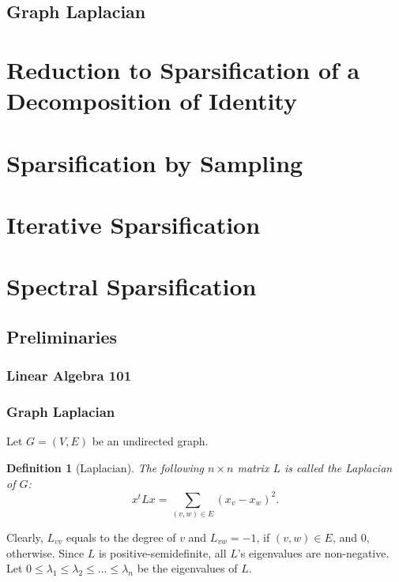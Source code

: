 \documentclass[12pt]{article}
\newtheorem{definition}{Definition}
\begin{document}
    \subsection{Graph Laplacian}

    \section{Reduction to Sparsification of a Decomposition of Identity}
    \label{reduction_unity}

    \section{Sparsification by Sampling}
    \label{resistances}

    \section{Iterative Sparsification}
    \label{iterative}

    \section{Spectral Sparsification}

    \subsection{Preliminaries}

    \subsubsection{Linear Algebra 101}


    \subsubsection{Graph Laplacian}

    Let $G = (V, E)$ be an undirected graph.

    \begin{definition}[Laplacian]
        The following $n \times n$ matrix $L$ is called the Laplacian of $G$:
        $$
            x^t L x = \sum_{(v,w) \in E} (x_v - x_w)^2. 
        $$
    \end{definition}

    Clearly, $L_{vv}$ equals to the degree of $v$ and $L_{vw} = -1$, if $(v, w) \in E$,
    and $0$, otherwise.
    Since $L$ is positive-semidefinite, all $L$'s eigenvalues are non-negative. Let
    $0 \leq \lambda_1 \leq \lambda_2 \leq \ldots \leq \lambda_n$ be the eigenvalues of $L$.
\end{document}
